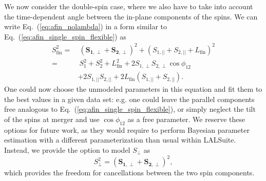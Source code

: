 \documentclass[%
aps,
prd,
amssymb,
amsmath,
amsfonts,
eqsecnum,
showpacs,
nofootinbib,
floatfix,
twocolumn,
twoside,
a4paper,
superscriptaddress
]{revtex4-1}
\begin{document}
We now consider the double-spin case, where we also have to take into account the time-dependent angle between the in-plane components of the spins. We can write Eq.~(\ref{eq:afin_nolambda}) in a form similar to Eq.~(\ref{eq:afin_single_spin_flexible}) as
\begin{subequations}
 \label{eq:afin_nolambda_doubleSpin_expanded}
\begin{align}
S_\mathrm{fin}^2 = &\: (\mathbf{S_{1,\perp}}+\mathbf{S_{2,\perp}})^2 + (S_{1,\vert\vert} +S_{2,\vert\vert} +L_\mathrm{fin})^2 \\
 = &\: S_{1}^2+S_{2}^2 + L_\mathrm{fin}^2
 + 2 S_{1,\perp} S_{2,\perp} \cos{\phi_{12}}\\
 & + 2 S_{1,\vert\vert} S_{2,\vert\vert}
 + 2 L_\mathrm{fin}(S_{1,\vert\vert} + S_{2,\vert\vert} ).
\end{align}
\end{subequations}
%
One could now choose the unmodeled parameters in this equation and fit them to the best values in a given data set: e.g. one could leave the parallel components free analogous to Eq.~(\ref{eq:afin_single_spin_flexible}), or simply neglect the tilt of the spins at merger and use 
$\cos{\phi_{12}}$ as a free parameter. We reserve these options for future work, as they would require to perform Bayesian parameter estimation with a different parameterization than usual within LALSuite. Instead, we provide the option to model $S_{\perp}$ as 
\begin{equation}\label{eq:Sperp_total}
   S_{\perp}^2 = (\mathbf{S_{1,\perp}}+\mathbf{S_{2,\perp}})^2 ,
\end{equation}
which provides the freedom for cancellations between the two spin components.
\end{document}

